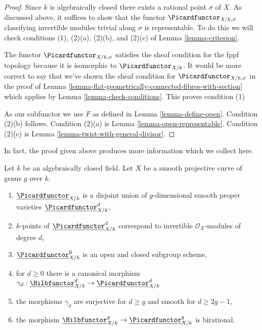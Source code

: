\begin{proof}
Since $k$ is algebraically closed there exists a rational point $\sigma$
of $X$. As discussed above, it suffices to show that the functor
$\Picardfunctor_{X/k, \sigma}$ classifying invertible modules trivial along
$\sigma$ is representable. To do this we will check conditions (1),
(2)(a), (2)(b), and (2)(c) of
Lemma \ref{lemma-criterion}.

\medskip\noindent
The functor $\Picardfunctor_{X/k, \sigma}$ satisfies the sheaf condition
for the fppf topology because it is isomorphic to $\Picardfunctor_{X/k}$.
It would be more correct to say that we've shown the sheaf condition
for $\Picardfunctor_{X/k, \sigma}$ in the proof of
Lemma \ref{lemma-flat-geometrically-connected-fibres-with-section}
which applies by Lemma \ref{lemma-check-conditions}.
This proves condition (1)

\medskip\noindent
As our subfunctor we use $F$ as defined in Lemma \ref{lemma-define-open}.
Condition (2)(b) follows.
Condition (2)(a) is Lemma \ref{lemma-open-representable}.
Condition (2)(c) is Lemma \ref{lemma-twist-with-general-divisor}.
\end{proof}

\noindent
In fact, the proof given above produces more information which we
collect here.

\begin{lemma}
\label{lemma-picard-pieces}
Let $k$ be an algebraically closed field. Let $X$ be a smooth projective
curve of genus $g$ over $k$.
\begin{enumerate}
\item $\underline{\Picardfunctor}_{X/k}$ is a disjoint union of
$g$-dimensional smooth proper varieties $\underline{\Picardfunctor}^d_{X/k}$,
\item $k$-points of $\underline{\Picardfunctor}^d_{X/k}$
correspond to invertible $\mathcal{O}_X$-modules of degree $d$,
\item $\underline{\Picardfunctor}^0_{X/k}$
is an open and closed subgroup scheme,
\item for $d \geq 0$ there is a canonical morphism
$\gamma_d :
\underline{\Hilbfunctor}^d_{X/k} \to \underline{\Picardfunctor}^d_{X/k}$
\item the morphisms $\gamma_d$
are surjective for $d \geq g$ and smooth for $d \geq 2g - 1$,
\item the morphism
$\underline{\Hilbfunctor}^g_{X/k} \to \underline{\Picardfunctor}^g_{X/k}$
is birational.
\end{enumerate}
\end{lemma}


